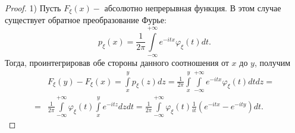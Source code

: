     \begin{proof} 1) Пусть $F_{\xi}(x)-$ абсолютно непрерывная функция. В этом случае существует обратное преобразование Фурье:
    $$
    p_{\xi}(x)=\frac{1}{2 \pi} \int\limits_{-\infty}^{+\infty} e^{-i t x} \varphi_{\xi}(t) d t .
    $$
    Тогда, проинтегрировав обе стороны данного соотношения от $x$ до $y$, получим
    $$
    \begin{aligned}
    & F_{\xi}(y)-F_{\xi}(x)=\int\limits_x^y p_{\xi}(z) d z=\frac{1}{2 \pi} \int\limits_x^y \int\limits_{-\infty}^{+\infty} e^{-i t x} \varphi_{\xi}(t) d t d z= \\
    = & \frac{1}{2 \pi} \int\limits_{-\infty}^{+\infty} \varphi_{\xi}(t) \int\limits_x^y e^{-i t z} d z d t=\frac{1}{2 \pi} \int\limits_{-\infty}^{+\infty} \varphi_{\xi}(t) \frac{1}{i t}\left(e^{-i t x}-e^{-i t y}\right) d t .
    \end{aligned}
    $$
    

\end{proof}
